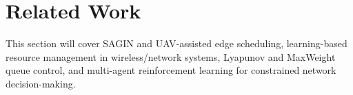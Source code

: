 \section{Related Work}

This section will cover SAGIN and UAV-assisted edge scheduling, learning-based
resource management in wireless/network systems, Lyapunov and MaxWeight queue
control, and multi-agent reinforcement learning for constrained network
decision-making.

